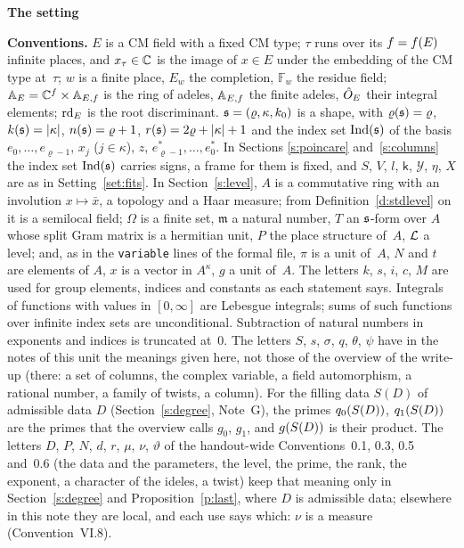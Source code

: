 \documentclass[11pt,a4paper]{article}
\newcommand{\F}{\mathbb{F}}
\newcommand{\sect}[2]{\refstepcounter{section}\label{#2}\par\addvspace{19pt plus 4pt minus 2pt}\Needspace{7\baselineskip}%
  \noindent\llap{{\fontsize{13.2}{16}\selectfont\bfseries\color{inkfaint}\thesection}\hspace{9pt}}%
  {\fontsize{13.2}{16}\selectfont\bfseries\color{ink}#1}\par\nopagebreak\vspace{-1pt}}
\theoremstyle{plainx}
\theoremstyle{uprightx}
\newenvironment{conventions}{\par\addvspace{5pt}\noindent\textbf{Conventions.}\enspace\ignorespaces}{\par\addvspace{3pt}}
\newcommand{\SD}[1]{S(#1)}                            %
\begin{document}
\sect{The setting}{s:setting}
\begin{conventions}\label{c:conventions}
$E$ is a CM field with a fixed CM type; $\tau$ runs over its $f=f(E)$ infinite places, and $x_\tau\in\mathbb{C}$ is the
image of $x\in E$ under the embedding of the CM type at~$\tau$; $w$ is a finite place, $E_w$ the completion, $\F_w$
the residue field; $\mathbb{A}_{E}=\mathbb{C}^{f}\times\mathbb{A}_{E,f}$ is the ring of adeles, $\mathbb{A}_{E,f}$ the finite adeles, $\hat{O}_E$ their integral
elements; $\operatorname{rd}_{E}$ is the root discriminant. $\mathfrak{s}=(\varrho,\kappa,k_0)$ is a shape, with $\varrho(\mathfrak{s})=\varrho$,
$k(\mathfrak{s})=|\kappa|$, $n(\mathfrak{s})=\varrho+1$, $r(\mathfrak{s})=2\varrho+|\kappa|+1$ and the index set $\operatorname{Ind}(\mathfrak{s})$ of the basis
$e_0,\dots,e_{\varrho-1}$, $x_j$ ($j\in\kappa$), $z$, $e^*_{\varrho-1},\dots,e^*_0$. In Sections \ref{s:poincare}
and~\ref{s:columns} the index set $\operatorname{Ind}(\mathfrak{s})$ carries signs, a frame for them is fixed, and $S$, $V$, $l$,
$\mathsf{k}$, $\mathcal{Y}$, $\eta$, $X$ are as in Setting~\ref{set:fits}. In Section~\ref{s:level}, $A$ is a
commutative ring with an involution $x\mapsto\bar x$, a topology and a Haar measure; from Definition~\ref{d:stdlevel}
on it is a semilocal field; $\Omega$ is a finite set, $\mathfrak{m}$ a natural number, $T$ an $\mathfrak{s}$-form over $A$
whose split Gram matrix is a hermitian unit, $P$ the place structure of~$A$, $\mathcal{L}$ a level; and, as in the
\texttt{variable} lines of the formal file, $\pi$ is a unit of~$A$, $N$ and $t$ are elements of $A$, $x$ is a vector
in $A^{\kappa}$, $g$ a unit of~$A$. The letters $k$, $s$, $i$, $c$, $M$ are used for group elements, indices and
constants as each statement says. Integrals of functions with values in $[0,\infty]$ are Lebesgue integrals; sums of
such functions over infinite index sets are unconditional. Subtraction of natural numbers in exponents and indices is
truncated at~$0$. The letters $S$, $s$, $\sigma$, $q$, $\theta$, $\psi$ have in the notes of this unit the
meanings given here, not those of the overview of the write-up (there: a set of columns, the complex variable, a
field automorphism, a rational number, a family of twists, a column). For the filling data
$\SD{D}$ of admissible data $D$ (Section~\ref{s:degree}, Note~G), the primes $\qS{\SD{D}}{0}$, $\qS{\SD{D}}{1}$ are the
primes that the overview calls $g_0$, $g_1$, and $\gS{\SD{D}}$ is their product. The letters $D$, $P$, $N$, $d$, $r$, $\mu$, $\nu$, $\vartheta$ of the handout-wide Conventions~0.1, 0.3, 0.5 and~0.6 (the data and the
parameters, the level, the prime, the rank, the exponent, a character of the ideles, a twist) keep that meaning only in Section~\ref{s:degree} and
Proposition~\ref{p:last}, where $D$ is admissible data; elsewhere in this note they are local, and each use says which: $\nu$ is a measure (Convention~VI.8).
\end{conventions}
\end{document}
